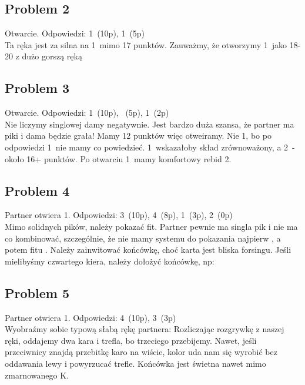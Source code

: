\documentclass[12pt, a4paper]{article}
\begin{document}
\subsection*{Problem 2}
Otwarcie.
Odpowiedzi: 1\clubs\ (10p), 1\nt\ (5p) \\
Ta ręka jest za silna na 1\nt\ mimo 17 punktów. Zauważmy, że otworzymy 1\clubs\ jako 18-20 z dużo gorszą ręką

\subsection*{Problem 3}
Otwarcie.
Odpowiedzi: 1\diams\ (10p), \pass\ (5p), 1\clubs\ (2p) \\
Nie liczymy singlowej damy negatywnie. Jest bardzo duża szansa, że partner ma piki i dama będzie grała!
Mamy 12 punktów więc otweiramy. Nie 1\clubs, bo po odpowiedzi 1\spades\ nie mamy co powiedzieć. 1\nt\ wskazałoby
skład zrównoważony, a 2\diams\ - około 16+ punktów. Po otwarciu 1\diams\ mamy komfortowy rebid 2\clubs.


\subsection*{Problem 4}
Partner otwiera 1\hearts.
Odpowiedzi: 3\hearts\ (10p), 4\hearts\ (8p), 1\spades\ (3p), 2\hearts\ (0p) \\
Mimo solidnych pików, należy pokazać fit. Partner pewnie ma singla pik i nie ma co kombinować,
szczególnie, że nie mamy systemu do pokazania najpierw \spades, a potem fitu \hearts.
Należy zainwitować końcówkę, choć karta jest bliska forsingu. Jeśli mielibyśmy czwartego kiera,
należy dołożyć końcówkę, np:

\subsection*{Problem 5}
Partner otwiera 1\hearts.
Odpowiedzi: 4\hearts\ (10p), 3\hearts\ (3p) \\
Wyobraźmy sobie typową słabą rękę partnera:
Rozliczając rozgrywkę z naszej ręki, oddajemy dwa kara i trefla, bo trzeciego przebijemy.
Nawet, jeśli przeciwnicy znajdą przebitkę karo na wiście, kolor uda nam się wyrobić bez oddawania lewy 
i powyrzucać trefle. Końcówka jest świetna nawet mimo zmarnowanego \spades K.
\end{document}
